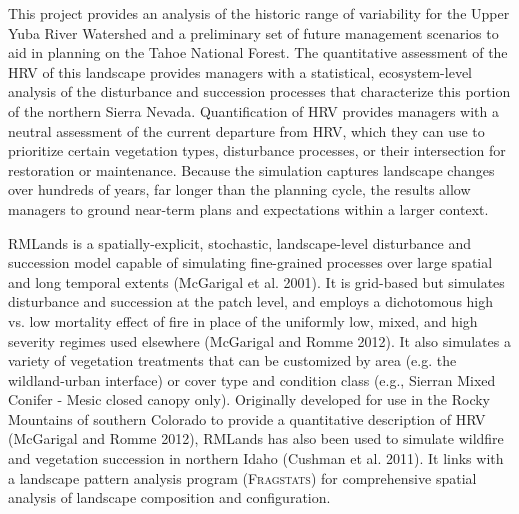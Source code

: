 This project provides an analysis of the historic range of variability for the Upper Yuba River Watershed and a preliminary set of future management scenarios to aid in planning on the Tahoe National Forest. The quantitative assessment of the HRV of this landscape provides managers with a statistical, ecosystem-level analysis of the disturbance and succession processes that characterize this portion of the northern Sierra Nevada. Quantification of HRV provides managers with a neutral assessment of the current departure from HRV, which they can use to prioritize certain vegetation types, disturbance processes, or their intersection for restoration or maintenance. Because the simulation captures landscape changes over hundreds of years, far longer than the planning cycle, the results allow managers to ground near-term plans and expectations within a larger context. 

RMLands is a spatially-explicit, stochastic, landscape-level disturbance and succession model capable of simulating fine-grained processes over large spatial and long temporal extents (McGarigal et al. 2001). It is grid-based but simulates disturbance and succession at the patch level, and employs a dichotomous high vs. low mortality effect of fire in place of the uniformly low, mixed, and high severity regimes used elsewhere (McGarigal and Romme 2012). It also simulates a variety of vegetation treatments that can be customized by area (e.g. the wildland-urban interface) or cover type and condition class (e.g., Sierran Mixed Conifer - Mesic closed canopy only). Originally developed for use in the Rocky Mountains of southern Colorado to provide a quantitative description of HRV (McGarigal and Romme 2012), RMLands has also been used to simulate wildfire and vegetation succession in northern Idaho (Cushman et al. 2011). It links with a landscape pattern analysis program (\textsc{Fragstats}) for comprehensive spatial analysis of landscape composition and configuration.  

